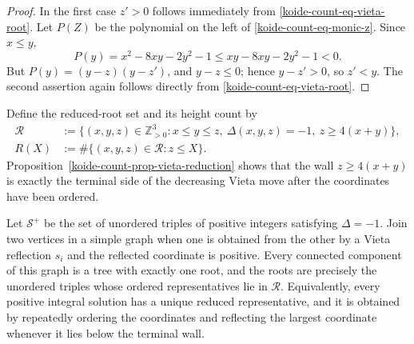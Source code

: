 \begin{proof}
In the first case \(z'>0\) follows immediately from
\eqref{koide-count-eq-vieta-root}.  Let \(P(Z)\) be the polynomial on the
left of \eqref{koide-count-eq-monic-z}.  Since \(x\leq y\),
\[
 P(y)=x^2-8xy-2y^2-1
 \leq xy-8xy-2y^2-1<0.
\]
But \(P(y)=(y-z)(y-z')\), and \(y-z\leq0\); hence \(y-z'>0\), so
\(z'<y\).  The second assertion again follows directly from
\eqref{koide-count-eq-vieta-root}.
\end{proof}

Define the reduced-root set and its height count by
\begin{align}
 \mathcal R
 &:={}
 \{(x,y,z)\in\mathbb Z_{>0}^3:
 x\leq y\leq z,\ \Delta(x,y,z)=-1,\ z\geq4(x+y)\},
 \label{koide-count-eq-reduced-set}\\
 R(X)&:=\#\{(x,y,z)\in\mathcal R:z\leq X\}.
 \label{koide-count-eq-rx-definition}
\end{align}
Proposition~\ref{koide-count-prop-vieta-reduction} shows that the wall
\(z\geq4(x+y)\) is exactly the terminal side of the decreasing Vieta move
after the coordinates have been ordered.

\begin{proposition}
\label{koide-count-prop-vieta-forest}
Let $\mathcal S^+$ be the set of unordered triples of positive integers
satisfying $\Delta=-1$.  Join two vertices in a simple graph when one is
obtained from the other by a Vieta reflection $s_i$ and the reflected
coordinate is positive.  Every connected component of this graph is a
tree with exactly one root, and the roots are precisely the unordered
triples whose ordered representatives lie in $\mathcal R$.  Equivalently,
every positive integral solution has a unique reduced representative, and
it is obtained by repeatedly ordering the coordinates and reflecting the
largest coordinate whenever it lies below the terminal wall.
\end{proposition}

